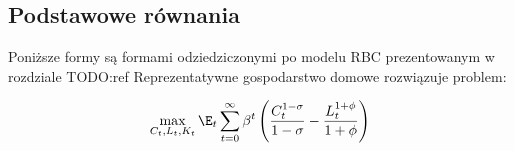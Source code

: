 









\subsection{Podstawowe równania}

Poniższe formy są formami odziedziczonymi po modelu RBC prezentowanym w rozdziale TODO:ref Reprezentatywne gospodarstwo domowe rozwiązuje problem:

\begin{equation}
    \max_{C_t, L_t, K_t} \E_t \sum_{t=0}^{\infty} \beta^t \left( \frac{C^{1-\sigma}_t}{1-\sigma} - \frac{L_t^{1+\phi}}{1+\phi}\right)
\end{equation}

